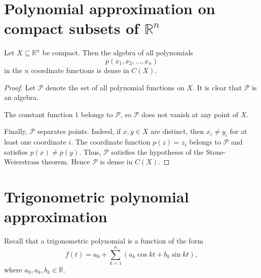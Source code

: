 \section{Polynomial approximation on compact subsets of \(\mathbb{R} ^n\)}
\begin{corollary} \label{cl: polynomial dense in C(X)}
    Let \(X \subseteq \mathbb{R} ^n\) be compact. Then the algebra of all polynomials 
    \[
        p(x_1, x_2, \dots , x_n)
    \] 
    in the \(n\) coordinate functions is dense in \(C(X)\).  
\end{corollary}

\begin{proof}
    Let \(\mathcal{P} \) denote the set of all polynomial functions on \(X\). It is clear that \(\mathcal{P} \) is an algebra. 

    The constant function \(1\) belongs to \(\mathcal{P}\), so \(\mathcal{P} \) does not vanish at any point of \(X\). 

    Finally, \(\mathcal{P} \) separates points. Indeed, if \(x, y \in X\) are distinct, then \(x_i \neq y_i\) for at least one coordinate \(i\). The coordinate function \(p(z) = z_i\) belongs to \(\mathcal{P}\) and satisfies \(p(x) \neq p(y)\). Thus, \(\mathcal{P} \) satisfies the hypotheses of the Stone-Weierstrass theorem. Hence \(\mathcal{P}\) is dense in \(C(X)\).                  
\end{proof}

\section{Trigonometric polynomial approximation}
Recall that a trigonometric polynomial is a function of the form 
\[
    f(t) = a_0 + \sum_{k=1}^n \left( a_k \cos kt + b_k \sin kt \right),  
\]
where \(a_0, a_k, b_k \in \mathbb{R}\). 

